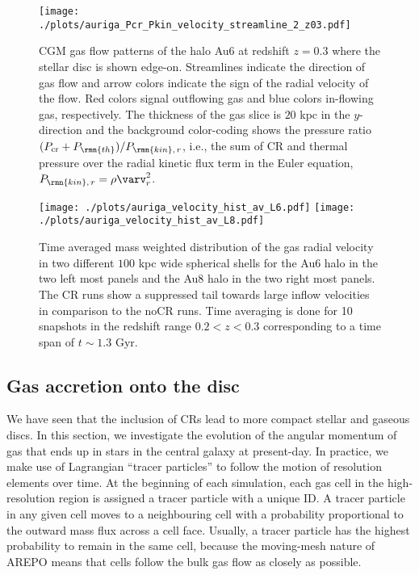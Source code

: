 \documentclass[useAMS,usenatbib]{mnras}
\newcommand{\CR}{\mathrm{cr}}
\begin{document}
\begin{figure*}
\vspace*{-.4cm}
\begin{center}
\texttt{[image: ./plots/auriga\_Pcr\_Pkin\_velocity\_streamline\_2\_z03.pdf]}
\end{center}
\vspace{-.35cm}
\caption{CGM gas flow patterns of the halo Au6 at redshift $z=0.3$ where the stellar disc is shown edge-on. Streamlines indicate the direction of gas flow and arrow colors indicate the sign of the radial velocity of the flow. Red colors signal outflowing gas and blue colors in-flowing gas, respectively. The thickness of the gas slice is $20$ kpc in the $y$-direction and the background color-coding shows the pressure ratio $(P_\CR + P_\rmn{th})/P_{\rmn{kin},\,r}$, i.e., the sum of CR and thermal pressure over the radial kinetic flux term in the Euler equation, $P_{\rmn{kin},\,r}=\rho \varv_r^2$.}
\label{fig:flow}
\end{figure*}


\begin{figure*}
\begin{center}
\texttt{[image: ./plots/auriga\_velocity\_hist\_av\_L6.pdf]}
\texttt{[image: ./plots/auriga\_velocity\_hist\_av\_L8.pdf]}
\end{center}
\vspace{-.7cm}
\caption{Time averaged mass weighted distribution of the gas radial velocity in two different $100$ kpc wide spherical shells for the Au6 halo in the two left most panels and the Au8 halo in the two right most panels. The CR runs show a suppressed tail towards large inflow velocities in comparison to the noCR runs. Time averaging is done for 10 snapshots in the redshift range $0.2<z<0.3$ corresponding to a time span of $t\sim1.3$ Gyr.}
\label{fig:flow2}
\end{figure*}


\subsection{Gas accretion onto the disc}
\label{sec:accr}

We have seen that the inclusion of CRs lead to more compact stellar and gaseous discs. In this section, we investigate the evolution of the angular momentum of gas that ends up in stars in the central galaxy at present-day. In practice, we make use of Lagrangian ``tracer particles'' \citep{Genel2013,Grand2019} to follow the motion of resolution elements over time. At the beginning of each simulation, each gas cell in the high-resolution region is assigned a tracer particle with a unique ID. A tracer particle in any given cell moves to a neighbouring cell with a probability proportional to the outward mass flux across a cell face. Usually, a tracer particle has the highest probability  to remain in the same cell, because the moving-mesh nature of AREPO means that cells follow the bulk gas flow as closely as possible.  
\end{document}
